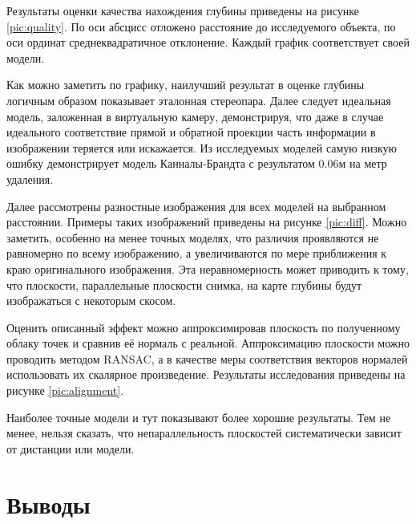 
Результаты оценки качества нахождения глубины приведены на рисунке \ref{pic:quality}. По оси абсцисс отложено расстояние до исследуемого объекта,
по оси ординат среднеквадратичное отклонение. Каждый график соответствует своей модели.

Как можно заметить по графику, наилучший результат в оценке глубины логичным образом показывает эталонная стереопара. Далее следует 
идеальная модель, заложенная в виртуальную камеру, демонстрируя, что даже в случае идеального соответствие прямой и обратной проекции часть 
информации в изображении теряется или искажается. Из исследуемых моделей самую низкую ошибку демонстрирует модель Канналы-Брандта с результатом
0.06м на метр удаления. 

Далее рассмотрены разностные изображения для всех моделей на выбранном расстоянии. Примеры таких изображений приведены на рисунке \ref{pic:diff}.
Можно заметить, особенно на менее точных моделях, что различия проявляются не равномерно по всему изображению, а увеличиваются по мере приближения 
к краю оригинального изображения. Эта неравномерность может приводить к тому, что плоскости, параллельные плоскости снимка, на карте глубины будут 
изображаться с некоторым скосом.



Оценить описанный эффект можно аппроксимировав плоскость по полученному облаку точек и сравнив её нормаль с реальной. Аппроксимацию плоскости можно проводить
методом RANSAC, а в качестве меры соответствия векторов нормалей использовать их скалярное произведение.  
Результаты исследования приведены на рисунке \ref{pic:alignment}.  


Наиболее точные модели и тут показывают более хорошие результаты. Тем не менее, нельзя сказать, что непараллельность плоскостей систематически зависит от 
дистанции или модели. 

\section{Выводы}
\label{conclusion}

